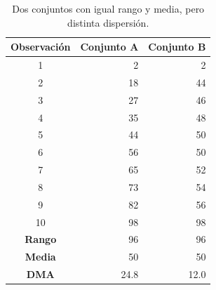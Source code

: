 \begin{table}[ht]
\centering
\begin{tabular}{crr}
\toprule
\textbf{Observación} & \textbf{Conjunto A} & \textbf{Conjunto B} \\
\midrule
1  &  2 &  2 \\
2  & 18 & 44 \\
3  & 27 & 46 \\
4  & 35 & 48 \\
5  & 44 & 50 \\
6  & 56 & 50 \\
7  & 65 & 52 \\
8  & 73 & 54 \\
9  & 82 & 56 \\
10 & 98 & 98 \\
\bottomrule
\textbf{Rango} & 96 & 96 \\
\textbf{Media} & 50 & 50 \\
\textbf{DMA}   & \num{24,8} & \num{12,0} \\
\bottomrule
\end{tabular}
\caption{Dos conjuntos con igual rango y media, pero distinta dispersión.}
\end{table}

